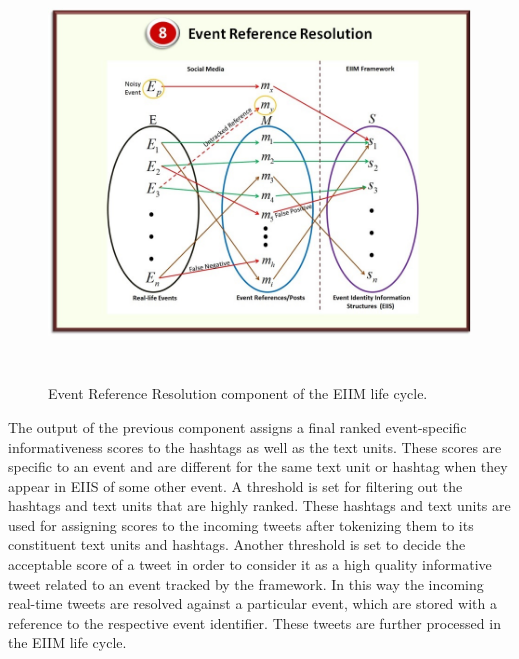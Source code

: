 \begin{figure}[htbp]
  \caption{Event Reference Resolution component of the EIIM life cycle.}
  \centering
    \includegraphics[width=14cm,height=11cm]{Figures/EIIMComponents/EventReferenceResolution.jpg}
\end{figure}
The output of the previous component assigns a final ranked event-specific informativeness scores to the hashtags as well as the text units. These scores are specific to an event and are different for the same text unit or hashtag when they appear in EIIS of some other event.  A threshold is set for filtering out the hashtags and text units that are highly ranked. These hashtags and text units are used for assigning scores to the incoming tweets after tokenizing them to its constituent text units and hashtags. Another threshold is set to decide the acceptable score of a tweet in order to consider it as a high quality informative tweet related to an event tracked by the framework. In this way the incoming real-time tweets are resolved against a particular event, which are stored with a reference to the respective event identifier. These tweets are further processed in the EIIM life cycle.

